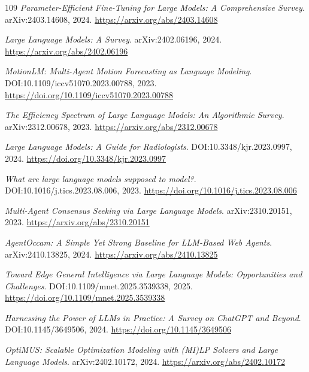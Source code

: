 \documentclass[11pt,a4paper]{article}
\begin{document}
\begin{thebibliography}{109}
\newblock \emph{Parameter-Efficient Fine-Tuning for Large Models: A Comprehensive Survey}.
\newblock arXiv:2403.14608, 2024.
\newblock \url{https://arxiv.org/abs/2403.14608}

\newblock \emph{Large Language Models: A Survey}.
\newblock arXiv:2402.06196, 2024.
\newblock \url{https://arxiv.org/abs/2402.06196}

\newblock \emph{MotionLM: Multi-Agent Motion Forecasting as Language Modeling}.
\newblock DOI:10.1109/iccv51070.2023.00788, 2023.
\newblock \url{https://doi.org/10.1109/iccv51070.2023.00788}

\newblock \emph{The Efficiency Spectrum of Large Language Models: An Algorithmic Survey}.
\newblock arXiv:2312.00678, 2023.
\newblock \url{https://arxiv.org/abs/2312.00678}

\newblock \emph{Large Language Models: A Guide for Radiologists}.
\newblock DOI:10.3348/kjr.2023.0997, 2024.
\newblock \url{https://doi.org/10.3348/kjr.2023.0997}

\newblock \emph{What are large language models supposed to model?}.
\newblock DOI:10.1016/j.tics.2023.08.006, 2023.
\newblock \url{https://doi.org/10.1016/j.tics.2023.08.006}

\newblock \emph{Multi-Agent Consensus Seeking via Large Language Models}.
\newblock arXiv:2310.20151, 2023.
\newblock \url{https://arxiv.org/abs/2310.20151}

\newblock \emph{AgentOccam: A Simple Yet Strong Baseline for LLM-Based Web Agents}.
\newblock arXiv:2410.13825, 2024.
\newblock \url{https://arxiv.org/abs/2410.13825}

\newblock \emph{Toward Edge General Intelligence via Large Language Models: Opportunities and Challenges}.
\newblock DOI:10.1109/mnet.2025.3539338, 2025.
\newblock \url{https://doi.org/10.1109/mnet.2025.3539338}

\newblock \emph{Harnessing the Power of LLMs in Practice: A Survey on ChatGPT and Beyond}.
\newblock DOI:10.1145/3649506, 2024.
\newblock \url{https://doi.org/10.1145/3649506}

\newblock \emph{OptiMUS: Scalable Optimization Modeling with (MI)LP Solvers and Large Language Models}.
\newblock arXiv:2402.10172, 2024.
\newblock \url{https://arxiv.org/abs/2402.10172}


\end{thebibliography}
\end{document}
